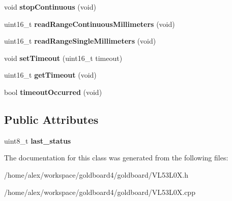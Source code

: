 \begin{DoxyCompactItemize}
\item 
void {\bfseries stop\+Continuous} (void)\hypertarget{class_v_l53_l0_x_aaa035aea7642fbf97e7946a1159ca5a5}{}\label{class_v_l53_l0_x_aaa035aea7642fbf97e7946a1159ca5a5}

\item 
uint16\+\_\+t {\bfseries read\+Range\+Continuous\+Millimeters} (void)\hypertarget{class_v_l53_l0_x_a198b2629c8d805ce23b2b2dd3c3cf7cf}{}\label{class_v_l53_l0_x_a198b2629c8d805ce23b2b2dd3c3cf7cf}

\item 
uint16\+\_\+t {\bfseries read\+Range\+Single\+Millimeters} (void)\hypertarget{class_v_l53_l0_x_a49e5ed380d53cbcedad7b96ec1eadb44}{}\label{class_v_l53_l0_x_a49e5ed380d53cbcedad7b96ec1eadb44}

\item 
void {\bfseries set\+Timeout} (uint16\+\_\+t timeout)\hypertarget{class_v_l53_l0_x_a421ae3c8aaad208e7e8c07c6f88cf486}{}\label{class_v_l53_l0_x_a421ae3c8aaad208e7e8c07c6f88cf486}

\item 
uint16\+\_\+t {\bfseries get\+Timeout} (void)\hypertarget{class_v_l53_l0_x_ac33d634573c44958b28ca42db5df0814}{}\label{class_v_l53_l0_x_ac33d634573c44958b28ca42db5df0814}

\item 
bool {\bfseries timeout\+Occurred} (void)\hypertarget{class_v_l53_l0_x_a7356434e330aa7c4243d75ec5349db5d}{}\label{class_v_l53_l0_x_a7356434e330aa7c4243d75ec5349db5d}

\end{DoxyCompactItemize}
\subsection*{Public Attributes}
\begin{DoxyCompactItemize}
\item 
uint8\+\_\+t {\bfseries last\+\_\+status}\hypertarget{class_v_l53_l0_x_af33d12ec0d1eb8630bb3473c07c2b853}{}\label{class_v_l53_l0_x_af33d12ec0d1eb8630bb3473c07c2b853}

\end{DoxyCompactItemize}


The documentation for this class was generated from the following files\+:\begin{DoxyCompactItemize}
\item 
/home/alex/workspace/goldboard4/goldboard/V\+L53\+L0\+X.\+h\item 
/home/alex/workspace/goldboard4/goldboard/V\+L53\+L0\+X.\+cpp\end{DoxyCompactItemize}

